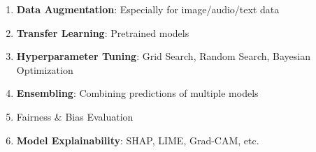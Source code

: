 \begin{enumerate}
    \item \textbf{Data Augmentation}: Especially for image/audio/text data
    \item \textbf{Transfer Learning}: Pretrained models
    \item \textbf{Hyperparameter Tuning}: Grid Search, Random Search, Bayesian Optimization
    \item \textbf{Ensembling}: Combining predictions of multiple models
    \item Fairness \& Bias Evaluation
    \item \textbf{Model Explainability}: SHAP, LIME, Grad-CAM, etc.
\end{enumerate}








